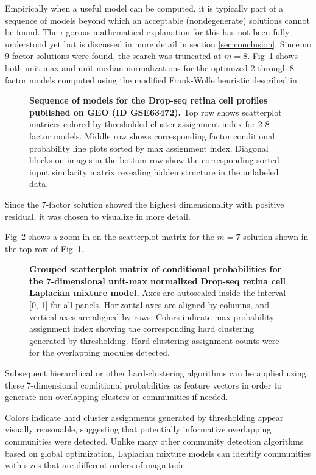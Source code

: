 \documentclass[10pt,letterpaper]{article}
\begin{document}
Empirically when a useful model can be computed, it is typically part of a sequence of models beyond which an acceptable (nondegenerate) solutions cannot be found.
The rigorous mathematical explanation for this has not been fully understood yet but is discussed in more detail in section \ref{sec:conclusion}.
Since no 9-factor solutions were found, the search was truncated at $m=8$.
Fig~\ref{fig:3} shows both unit-max and unit-median normalizations for the optimized 2-through-8 factor models computed using the modified Frank-Wolfe heuristic described in \cite{pard93}.
\begin{figure}[!h]
\caption{
{\bf Sequence of models for the Drop-seq retina cell profiles published on GEO (ID GSE63472).}
Top row shows scatterplot matrices colored by thresholded cluster assignment index for 2-8 factor models.
Middle row shows corresponding factor conditional probability line plots sorted by max assignment index.
Diagonal blocks on images in the bottom row show the corresponding sorted input similarity matrix revealing hidden structure in the unlabeled data.
}
\label{fig:3}
\end{figure}
Since the 7-factor solution showed the highest dimensionality with positive residual, it was chosen to visualize in more detail.

Fig~\ref{fig:4} shows a zoom in on the scatterplot matrix for the $m=7$ solution shown in the top row of Fig~\ref{fig:3}.
\begin{figure}[!h]
\caption{
{\bf Grouped scatterplot matrix of conditional probabilities for the 7-dimensional unit-max normalized Drop-seq retina cell Laplacian mixture model.}
Axes are autoscaled inside the interval [0, 1] for all panels.
Horizontal axes are aligned by columns, and vertical axes are aligned by rows.
Colors indicate max probability assignment index showing the corresponding hard clustering generated by thresholding.
Hard clustering assignment counts were for the overlapping modules detected.
}
\label{fig:4}
\end{figure}
Subsequent hierarchical or other hard-clustering algorithms  can be applied using these 7-dimensional conditional probabilities as feature vectors in order to generate non-overlapping clusters or communities if needed.

Colors indicate hard cluster assignments generated by thresholding appear visually reasonable, suggesting that potentially informative overlapping communities were detected.
Unlike many other community detection algorithms based on global optimization, Laplacian mixture models can identify communities with sizes that are different orders of magnitude.
\end{document}
